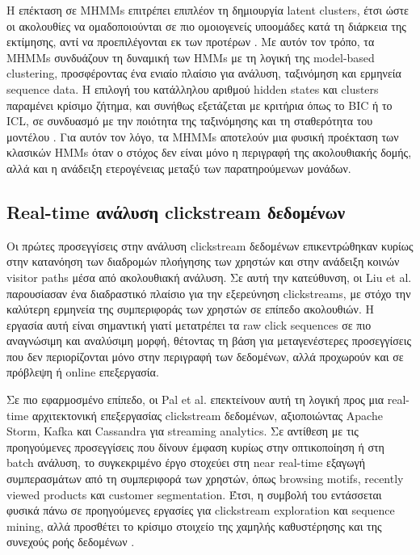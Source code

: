 \documentclass[12pt,a4paper]{article}
\begin{document}
	Η επέκταση σε MHMMs επιτρέπει επιπλέον τη δημιουργία latent clusters, έτσι ώστε οι ακολουθίες να ομαδοποιούνται σε πιο ομοιογενείς υποομάδες κατά τη διάρκεια της εκτίμησης, αντί να προεπιλέγονται εκ των προτέρων \cite{Helske2019}. Με αυτόν τον τρόπο, τα MHMMs συνδυάζουν τη δυναμική των HMMs με τη λογική της model-based clustering, προσφέροντας ένα ενιαίο πλαίσιο για ανάλυση, ταξινόμηση και ερμηνεία sequence data. Η επιλογή του κατάλληλου αριθμού hidden states και clusters παραμένει κρίσιμο ζήτημα, και συνήθως εξετάζεται με κριτήρια όπως το BIC ή το ICL, σε συνδυασμό με την ποιότητα της ταξινόμησης και τη σταθερότητα του μοντέλου \cite{Helske2019,Urso2024}. Για αυτόν τον λόγο, τα MHMMs αποτελούν μια φυσική προέκταση των κλασικών HMMs όταν ο στόχος δεν είναι μόνο η περιγραφή της ακολουθιακής δομής, αλλά και η ανάδειξη ετερογένειας μεταξύ των παρατηρούμενων μονάδων.

	\subsection{Real-time ανάλυση clickstream δεδομένων}
	
	Οι πρώτες προσεγγίσεις στην ανάλυση clickstream δεδομένων επικεντρώθηκαν κυρίως στην κατανόηση των διαδρομών πλοήγησης των χρηστών και στην ανάδειξη κοινών visitor paths μέσα από ακολουθιακή ανάλυση. Σε αυτή την κατεύθυνση, οι Liu et al. \cite{Liu2017} παρουσίασαν ένα διαδραστικό πλαίσιο για την εξερεύνηση clickstreams, με στόχο την καλύτερη ερμηνεία της συμπεριφοράς των χρηστών σε επίπεδο ακολουθιών. Η εργασία αυτή είναι σημαντική γιατί μετατρέπει τα raw click sequences σε πιο αναγνώσιμη και αναλύσιμη μορφή, θέτοντας τη βάση για μεταγενέστερες προσεγγίσεις που δεν περιορίζονται μόνο στην περιγραφή των δεδομένων, αλλά προχωρούν και σε πρόβλεψη ή online επεξεργασία.
	
	Σε πιο εφαρμοσμένο επίπεδο, οι Pal et al. \cite{Apache} επεκτείνουν αυτή τη λογική προς μια real-time αρχιτεκτονική επεξεργασίας clickstream δεδομένων, αξιοποιώντας Apache Storm, Kafka και Cassandra για streaming analytics. Σε αντίθεση με τις προηγούμενες προσεγγίσεις που δίνουν έμφαση κυρίως στην οπτικοποίηση ή στη batch ανάλυση, το συγκεκριμένο έργο στοχεύει στη near real-time εξαγωγή συμπερασμάτων από τη συμπεριφορά των χρηστών, όπως browsing motifs, recently viewed products και customer segmentation. Έτσι, η συμβολή του εντάσσεται φυσικά πάνω σε προηγούμενες εργασίες για clickstream exploration και sequence mining, αλλά προσθέτει το κρίσιμο στοιχείο της χαμηλής καθυστέρησης και της συνεχούς ροής δεδομένων \cite{Liu2017,Apache}.
\end{document}
